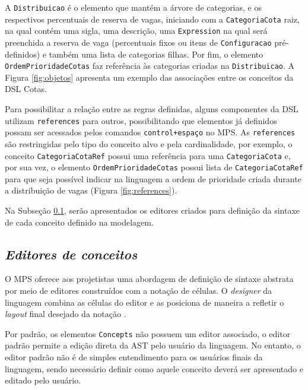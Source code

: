 A \texttt{Distribuicao} é o elemento que mantém a árvore de categorias, e os respectivos percentuais de reserva de vagas, iniciando com a \texttt{CategoriaCota} raiz, na qual contém uma sigla, uma descrição, uma \texttt{Expression} na qual será preenchida a reserva de vaga (percentuais fixos ou itens de \texttt{Configuracao} pré-definidos) e também uma lista de categorias filhas. Por fim, o elemento \texttt{OrdemPrioridadeCotas} faz referência às categorias criadas na \texttt{Distribuicao}. A Figura \ref{fig:objetos} apresenta um exemplo das associações entre os conceitos da DSL Cotas.



\newpage
Para possibilitar a relação entre as regras definidas, alguns componentes da \gls{DSL} utilizam \texttt{references} para outros, possibilitando que elementos já definidos possam ser acessados pelos comandos \texttt{control+espaço} no \gls{MPS}. As \texttt{references} são restringidas pelo tipo do conceito alvo e pela cardinalidade, por exemplo, o conceito \texttt{CategoriaCotaRef} possui uma referência para uma \texttt{CategoriaCota} e, por sua vez, o elemento \texttt{OrdemPrioridadeCotas} possui lista de \texttt{CategoriaCotaRef} para que seja possível indicar na linguagem a ordem de prioridade criada durante a distribuição de vagas (Figura \ref{fig:references}).




Na Subseção \ref{sub:sec:editores}, serão apresentados os editores criados para definição da sintaxe de cada conceito definido na modelagem.


\subsection{\textit{Editores de conceitos}}
\label{sub:sec:editores}
O \gls{MPS} oferece aos projetistas uma abordagem de definição de sintaxe abstrata por meio de editores construídos com a notação de células. O \textit{designer} da linguagem combina as células do editor e as posiciona de maneira a refletir o \textit{layout} final desejado da notação \cite{jetbrains}. 

Por padrão, os elementos \texttt{Concepts} não possuem um editor associado, o editor padrão permite a edição direta da \gls{AST} pelo usuário da linguagem. No entanto, o editor padrão não é de simples entendimento para os usuários finais da linguagem, sendo necessário definir como aquele conceito deverá ser apresentado e editado pelo usuário.

